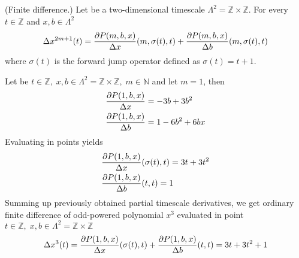 \begin{cor}
    \label{finite_difference_case}
    (Finite difference.)
    Let be a two-dimensional timescale
    $\Lambda^2 = \mathbb{Z} \times \mathbb{Z}$.
    For every $t\in\mathbb{Z}$ and $x,b\in \Lambda^2$
    \begin{align*}
        \Delta x^{2m+1} (t)
        = \frac{\partial P ( m, b, x )}{\Delta x} (m, \sigma(t), t)
        + \frac{\partial P ( m, b, x )}{\Delta b}(m, \sigma(t), t)
    \end{align*}
    where $\sigma(t)$ is the forward jump operator defined as $\sigma(t) = t+1$.
\end{cor}
\begin{examp}
    \label{time_scale_z_example_1}
    Let be $t \in \mathbb{Z}, \; x,b \in \Lambda^2 = \mathbb{Z} \times \mathbb{Z}, \; m\in\mathbb{N}$ and let $m=1$, then
    \begin{align*}
        &\frac{\partial P ( 1, b, x )}{\Delta x}                = -3 b + 3 b^2 \\
        &\frac{\partial P ( 1, b, x )}{\Delta b}                = 1 - 6 b^2 + 6 b x
    \end{align*}
    Evaluating in points yields
    \begin{align*}
        &\frac{\partial P ( 1, b, x )}{\Delta x} (\sigma(t), t) = 3 t + 3 t^2 \\
        &\frac{\partial P ( 1, b, x )}{\Delta b}(t,t)           = 1
    \end{align*}
    Summing up previously obtained partial timescale derivatives, we get ordinary finite difference of odd-powered polynomial
    $x^{3}$ evaluated in point $ t\in\mathbb{Z}, \; x,b\in\Lambda^2 = \mathbb{Z} \times \mathbb{Z}$
    \begin{align*}
        \Delta x^{3}(t)
        = \frac{\partial P ( 1, b, x )}{\Delta x} (\sigma(t), t)
        + \frac{\partial P ( 1, b, x )}{\Delta b}(t,t)
        = 3 t + 3 t^2 + 1
    \end{align*}
\end{examp}
